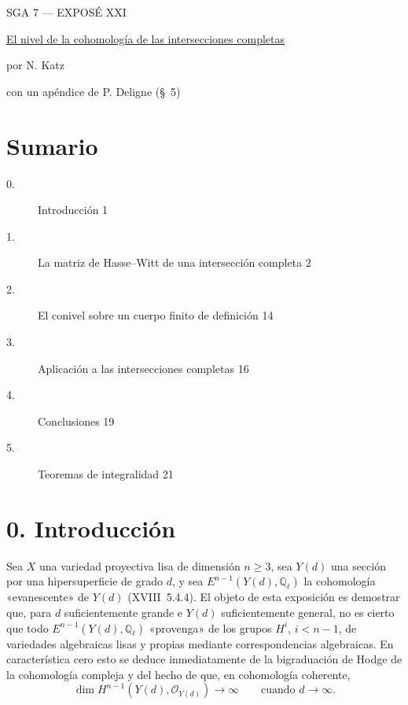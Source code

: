 \pageoriginale

\clearpage
{}
\begin{center}
{\large SGA 7 --- EXPOSÉ XXI}\par
\vspace{2em}
{\Large\underline{El nivel de la cohomología de las intersecciones
completas}}\par
\vspace{1.5em}
{\large por N. Katz}\par
\vspace{0.6em}
con un apéndice de P. Deligne (\S~5)
\end{center}

\section*{Sumario}
\begin{description}
\item[0.] Introducción \hfill 1
\item[1.] La matriz de Hasse--Witt de una intersección completa \hfill 2
\item[2.] El conivel sobre un cuerpo finito de definición \hfill 14
\item[3.] Aplicación a las intersecciones completas \hfill 16
\item[4.] Conclusiones \hfill 19
\item[5.] Teoremas de integralidad \hfill 21
\end{description}

\pageoriginale

\section*{0. Introducción}

Sea $X$ una variedad proyectiva lisa de dimensión $n\geq3$, sea $Y(d)$
una sección por una hipersuperficie de grado $d$, y sea
$E^{n-1}(Y(d),\mathbb Q_\ell)$ la cohomología «evanescente» de $Y(d)$
(XVIII~5.4.4). El objeto de esta exposición es demostrar que, para $d$
suficientemente grande e $Y(d)$ suficientemente general, no es cierto que
todo $E^{n-1}(Y(d),\mathbb Q_\ell)$ «provenga» de los grupos $H^i$,
$i<n-1$, de variedades algebraicas lisas y propias mediante
correspondencias algebraicas. En característica cero esto se deduce
inmediatamente de la bigraduación de Hodge de la cohomología compleja y
del hecho de que, en cohomología coherente,
\begin{equation*}
\dim H^{n-1}(Y(d),\mathcal O_{Y(d)})\longrightarrow\infty
\qquad\text{cuando }d\longrightarrow\infty.
\end{equation*}

